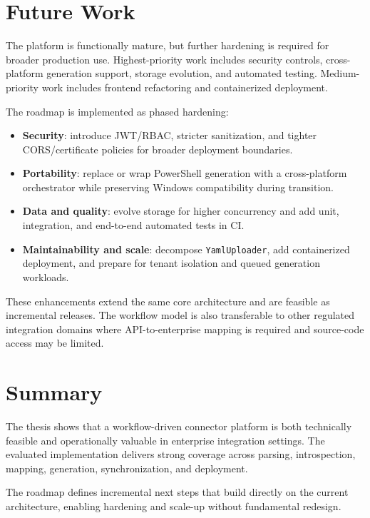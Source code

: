 \section{Future Work}

The platform is functionally mature, but further hardening is required for broader production use. Highest-priority work includes security controls, cross-platform generation support, storage evolution, and automated testing. Medium-priority work includes frontend refactoring and containerized deployment.

\noindent The roadmap is implemented as phased hardening:
\begin{itemize}
    \setlength\itemsep{2pt}
    \item \textbf{Security}: introduce JWT/RBAC, stricter sanitization, and tighter CORS/certificate policies for broader deployment boundaries.
    \item \textbf{Portability}: replace or wrap PowerShell generation with a cross-platform orchestrator while preserving Windows compatibility during transition.
    \item \textbf{Data and quality}: evolve storage for higher concurrency and add unit, integration, and end-to-end automated tests in CI.
    \item \textbf{Maintainability and scale}: decompose \texttt{YamlUploader}, add containerized deployment, and prepare for tenant isolation and queued generation workloads.
\end{itemize}

These enhancements extend the same core architecture and are feasible as incremental releases. The workflow model is also transferable to other regulated integration domains where API-to-enterprise mapping is required and source-code access may be limited.

\section{Summary}

The thesis shows that a workflow-driven connector platform is both technically feasible and operationally valuable in enterprise integration settings. The evaluated implementation delivers strong coverage across parsing, introspection, mapping, generation, synchronization, and deployment.

The roadmap defines incremental next steps that build directly on the current architecture, enabling hardening and scale-up without fundamental redesign.
